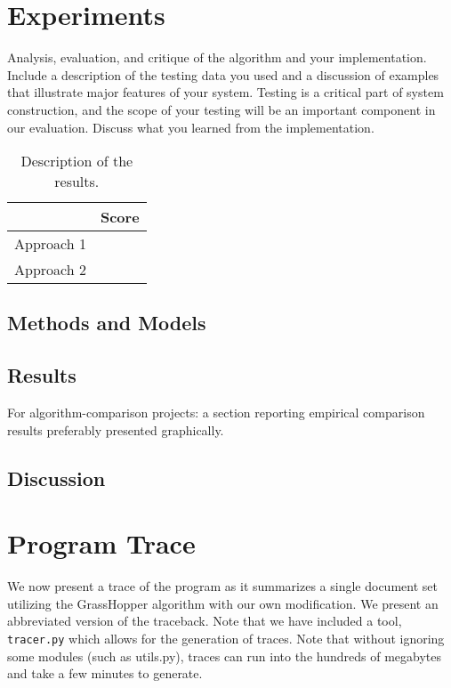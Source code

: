 \documentclass[11pt]{article}
\begin{document}
\section{Experiments}
Analysis, evaluation, and critique of the algorithm and your
implementation. Include a description of the testing data you used and
a discussion of examples that illustrate major features of your
system. Testing is a critical part of system construction, and the
scope of your testing will be an important component in our
evaluation. Discuss what you learned from the implementation.

\begin{table}
  \centering
  \begin{tabular}{ll}
    \toprule
    & Score \\
    \midrule
    Approach 1 & \\
    Approach 2 & \\
    \bottomrule
  \end{tabular}
  \caption{Description of the results.}
\end{table}

\subsection{Methods and Models}


\subsection{Results}

 For algorithm-comparison projects: a section reporting empirical comparison results preferably presented graphically.


\subsection{Discussion}


\appendix

\section{Program Trace}
\label{sec:program_trace}

We now present a trace of the program as it summarizes a single document set utilizing the {\sc GrassHopper} algorithm with our own modification. We present an abbreviated version of the traceback. Note that we have included a tool, \verb|tracer.py| which allows for the generation of traces. Note that without ignoring some modules (such as utils.py), traces can run into the hundreds of megabytes and take a few minutes to generate.
\end{document}
